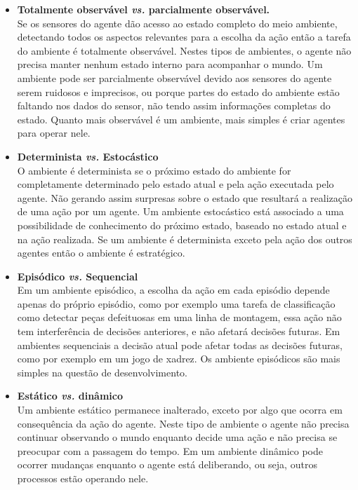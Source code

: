 \begin{itemize}
\item \textbf{Totalmente observável \textit{vs.} parcialmente observável.} \\
Se os sensores do agente dão acesso ao estado completo do meio ambiente, detectando todos os aspectos relevantes para a escolha da ação então a tarefa do ambiente é totalmente observável. Nestes tipos de ambientes, o agente não precisa manter nenhum estado interno para acompanhar o mundo. Um ambiente pode ser parcialmente observável devido aos sensores do agente serem ruidosos e imprecisos, ou porque partes do estado do ambiente estão faltando nos dados do sensor, não tendo assim informações completas do estado. Quanto mais observável é um ambiente, mais simples é criar agentes para operar nele.

\item \textbf{Determinista \textit{vs.} Estocástico}\\
O ambiente é determinista se o próximo estado do ambiente for completamente determinado pelo estado atual e pela ação executada pelo agente. Não gerando assim surpresas sobre o estado que resultará a realização de uma ação por um agente. Um ambiente estocástico está associado a uma possibilidade de conhecimento do próximo estado, baseado no estado atual e na ação realizada. Se um ambiente é determinista exceto pela ação dos outros agentes então o ambiente é estratégico.

\item \textbf{Episódico \textit{vs.} Sequencial} \\
Em um ambiente episódico, a escolha da ação em cada episódio depende apenas do próprio episódio, como por exemplo uma tarefa de classificação como detectar peças defeituosas em uma linha de montagem, essa ação não tem interferência de decisões anteriores, e não afetará decisões futuras. Em ambientes sequenciais a decisão atual pode afetar todas as decisões futuras, como por exemplo em um jogo de xadrez. Os ambiente episódicos são mais simples na questão de desenvolvimento.

\item \textbf{Estático \textit{vs.} dinâmico} \\
Um ambiente estático permanece inalterado, exceto por algo que ocorra em consequência da ação do agente. Neste tipo de ambiente o agente não precisa continuar observando o mundo enquanto decide uma ação e não precisa se preocupar com a passagem do tempo. Em um ambiente dinâmico pode ocorrer mudanças enquanto o agente está deliberando, ou seja, outros processos estão operando nele.


\end{itemize}

